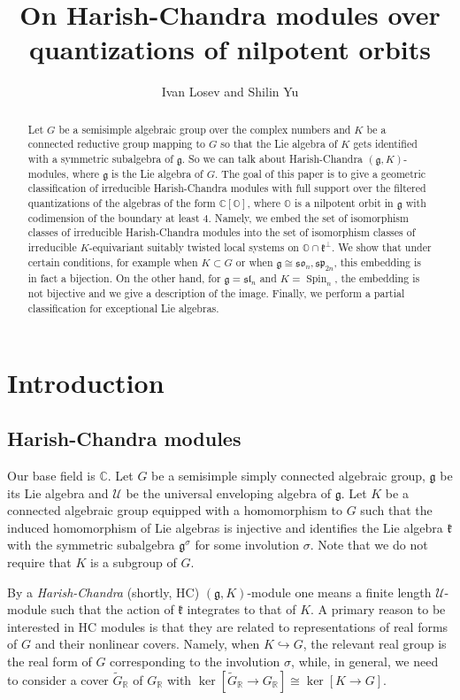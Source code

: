 \documentclass[12pt]{amsart}
\title{On Harish-Chandra modules over quantizations of nilpotent orbits}
\author{Ivan Losev and Shilin Yu}
\newcommand{\C}{\mathbb{C}}
\newcommand{\U}{\mathcal{U}}
\newcommand{\g}{\mathfrak{g}}
\newcommand{\Orb}{\mathbb{O}}
\newcommand{\kf}{\mathfrak{k}}
\newcommand{\R}{\mathbb{R}}
\theoremstyle{definition}
\numberwithin{equation}{section}
\begin{document}
\begin{abstract}
Let $G$ be a semisimple algebraic group over the complex numbers and $K$ be a connected reductive group mapping to $G$
so that the Lie algebra of $K$ gets identified with a symmetric subalgebra of $\g$. So we can talk about Harish-Chandra 
$(\g,K)$-modules, where $\g$ is the Lie algebra of $G$.
The goal of this paper is to give a geometric classification of irreducible Harish-Chandra modules with full support 
over the filtered quantizations of the algebras of the form $\C[\Orb]$, where $\Orb$ is a nilpotent orbit in $\g$ with 
codimension of the boundary at least $4$. Namely, we embed the set of isomorphism classes of irreducible Harish-Chandra modules into the set of 
isomorphism classes of irreducible $K$-equivariant suitably twisted local systems on $\Orb\cap \mathfrak{k}^\perp$. We show that
under certain conditions, for example when $K\subset G$ or when $\g\cong \mathfrak{so}_n,\mathfrak{sp}_{2n}$, this embedding is 
in fact a bijection. On the other hand, for $\g=\mathfrak{sl}_n$ and $K=\operatorname{Spin}_n$, the embedding is not 
bijective and we give a description of the image. Finally, we perform a partial classification for exceptional Lie algebras. 
\end{abstract}
\maketitle
\tableofcontents
\section{Introduction}
\subsection{Harish-Chandra modules}
Our base field is $\C$. Let $G$ be a semisimple simply connected algebraic group,
$\g$ be its Lie algebra and $\U$
be the universal enveloping algebra of $\g$. Let $K$ be a connected algebraic group equipped with
a homomorphism to $G$ such that the induced homomorphism of Lie algebras is injective and
identifies the Lie algebra $\kf$ with the symmetric subalgebra $\g^{\sigma}$ for some involution
$\sigma$. Note that we do not require that $K$ is a subgroup of $G$. 

By a {\it Harish-Chandra} (shortly, HC) {$(\g,K)$-module} one means a finite length $\U$-module such that the action of $\kf$ integrates to that of $K$. A primary reason to be interested in
HC modules is that they are related to representations of real forms of $G$ and their nonlinear covers.
Namely, when $K\hookrightarrow G$, the relevant real group is the real form of $G$ corresponding
to the involution $\sigma$, while, in general, we need to consider a cover $\tilde{G}_{\R}$ of $G_\mathbb{R}$ with $\ker[\tilde{G}_{\R}\rightarrow G_\R]\cong \ker[K\rightarrow G]$.
\end{document}
